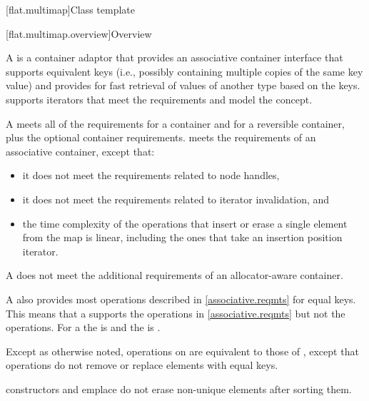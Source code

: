 [flat.multimap]{Class template }

[flat.multimap.overview]{Overview}

\pnum
{}%
A  is a container adaptor
that provides an associative container interface
that supports equivalent keys
(i.e., possibly containing multiple copies of the same key value) and
provides for fast retrieval of values of another type 
based on the keys.
 supports iterators that meet
the  requirements and
model the
 concept.

\pnum
A  meets all of the requirements
for a container and
for a reversible container,
plus the optional container requirements.
 meets the requirements of
an associative container, except that:
\begin{itemize}
\item
it does not meet the requirements related to node handles,
\item
it does not meet the requirements related to iterator invalidation, and
\item
the time complexity of the operations
that insert or erase a single element from the map is linear,
including the ones that take an insertion position iterator.
\end{itemize}
\begin{note}
A  does not meet the additional requirements of an
allocator-aware container.
\end{note}

\pnum
A  also provides most operations described
in \ref{associative.reqmts} for equal keys.
This means that a  supports
the  operations in \ref{associative.reqmts}
but not the  operations.
For a 
the  is  and
the  is .

\pnum
Except as otherwise noted,
operations on  are equivalent to those of ,
except that  operations
do not remove or replace elements with equal keys.
\begin{example}
 constructors and emplace do not erase
non-unique elements after sorting them.
\end{example}

